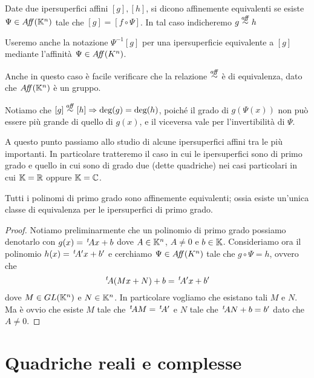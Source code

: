\begin{definition}
	Date due ipersuperfici affini $[g],[h]$, si dicono affinemente equivalenti se esiste $\Psi\in A\!f\!\!f(\mathbb K^n)$ tale che $[g]=[f\circ\Psi]$.
	In tal caso indicheremo $g\stackrel{a\!f\!\!f}{\sim} h$
\end{definition}
\begin{remark}
	Useremo anche la notazione $\Psi^{-1}[g]$ per una ipersuperficie equivalente a $[g]$ mediante l'affinità $\Psi \in A\!f\!\!f(K^n)$.
\end{remark}
\begin{remark}
	Anche in questo caso è facile verificare che la relazione $\stackrel{a\!f\!\!f}{\sim}$ è di equivalenza, dato che $A\!f\!\!f(\mathbb K^n)$ è un gruppo.
\end{remark}
\begin{remark}
	Notiamo che $[g]\stackrel{a\!f\!\!f}{\sim} [h]\Rightarrow \text{deg}(g)=\text{deg}(h)$,
	poiché il grado di $g(\Psi(x))$ non può essere più grande di quello di $g(x)$, e il viceversa vale per l'invertibilità di $\Psi$.
\end{remark}

A questo punto passiamo allo studio di alcune ipersuperfici affini tra le più importanti. In particolare tratteremo il caso in cui le ipersuperfici
sono di primo grado e quello in cui sono di grado due (dette quadriche) nei casi particolari in cui $\mathbb K=\mathbb R$ oppure $\mathbb K=\mathbb C$.

\begin{proposition}[Grado $1$]
	Tutti i polinomi di primo grado sono affinemente equivalenti;
	ossia esiste un'unica classe di equivalenza per le ipersuperfici di primo grado.
\end{proposition}

\begin{proof}
	Notiamo preliminarmente che un polinomio di primo grado possiamo denotarlo con $g(x)=\, ^{t}\!Ax+b$ dove $A\in \mathbb K^n$, $A\neq 0$ e $b\in \mathbb K$.
	Consideriamo ora il polinomio $h(x)=\, ^{t}\!A'x+b'$ e cerchiamo $\Psi\in A\!f\!\!f(K^n)$ tale che $g\circ \Psi = h$, ovvero che
	\[
		\, ^{t}\!A(Mx+N)+b=\, ^{t}\!A'x+b'
	\]
	dove $M\in GL(\mathbb K^n)$ e $N\in \mathbb K^n$. In particolare vogliamo che esistano tali $M$ e $N$.
	Ma è ovvio che esiste $M$ tale che $\, ^{t}\!AM=\, ^{t}\!A'$ e $N$ tale che $\, ^{t}\!AN+b=b'$ dato che $A\neq 0$.
\end{proof}


\section{Quadriche reali e complesse}

